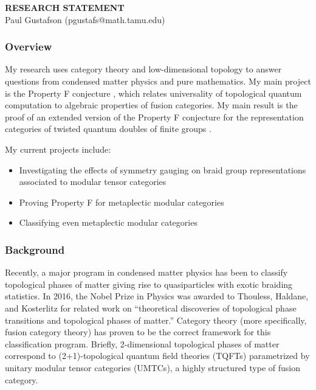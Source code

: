 \documentclass[12pt]{article}
\theoremstyle{plain} \numberwithin{equation}{section}
\theoremstyle{definition}
\begin{document}
\begin{center}
{\bf RESEARCH STATEMENT}\\
\vspace*{0.1cm}
{\normalsize Paul Gustafson (pgustafs@math.tamu.edu)}
\end{center}




\subsubsection*{Overview}

My research uses category theory and low-dimensional topology to answer questions from condensed matter physics and pure mathematics.   My main project is the Property F conjecture \cite{nr}, which relates universality of topological quantum computation to algebraic properties of fusion categories.  My main result is the proof of  an extended version of the Property F conjecture for the representation categories of twisted quantum doubles of finite groups \cite{g}. 

My current projects include:
\begin{itemize}
\item Investigating the effects of symmetry gauging on braid group representations associated to modular tensor categories
\item Proving Property F for metaplectic modular categories
\item Classifying even metaplectic modular categories
\end{itemize}

\subsubsection*{Background}

Recently, a major program in condensed matter physics has been to classify topological phases of matter giving rise to quasiparticles with exotic braiding statistics. In 2016, the Nobel Prize in Physics was awarded to Thouless, Haldane, and Kosterlitz for related work on ``theoretical discoveries of topological phase transitions and topological phases of matter.'' Category theory (more specifically, fusion category theory) has proven to be the correct framework for this classification program. Briefly, 2-dimensional topological phases of matter correspond to (2+1)-topological quantum field theories (TQFTs) parametrized by unitary modular tensor categories (UMTCs), a highly structured type of fusion category. 
\end{document}
